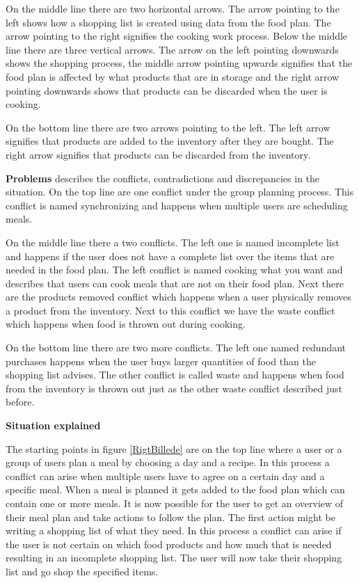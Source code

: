 On the middle line there are two horizontal arrows. The arrow pointing to the left shows how a shopping list is created using data from the food plan. The arrow pointing to the right signifies the cooking work process. Below the middle line there are three vertical arrows. The arrow on the left pointing downwards shows the shopping process, the middle arrow pointing upwards signifies that the food plan is affected by what products that are in storage and the right arrow pointing downwards shows that products can be discarded when the user is cooking. 

On the bottom line there are two arrows pointing to the left. The left arrow signifies that products are added to the inventory after they are bought. The right arrow signifies that products can be discarded from the inventory.            

\textbf{Problems} describes the conflicts, contradictions and discrepancies in the situation. On the top line are one conflict under the group planning process. This conflict is named synchronizing and happens when multiple users are scheduling meals. 

On the middle line there a two conflicts. The left one is named incomplete list and happens if the user does not have a complete list over the items that are needed in the food plan. The left conflict is named cooking what you want and describes that users can cook meals that are not on their food plan. Next there are the products removed conflict which happens when a user physically removes a product from the inventory. Next to this conflict we have the waste conflict which happens when food is thrown out during cooking.  

On the bottom line there are two more conflicts. The left one named redundant purchases happens when the user buys larger quantities of food than the shopping list advises. The other conflict is called waste and happens when food from the inventory is thrown out just as the other waste conflict described just before.           

\textbf{Situation explained}

The starting points in figure \ref{RigtBillede} are on the top line where a user or a group of users plan a meal by choosing a day and a recipe. In this process a conflict can arise when multiple users have to agree on a certain day and a specific meal. When a meal is planned it gets added to the food plan which can contain one or more meals. It is now possible for the user to get an overview of their meal plan and take actions to follow the plan. The first action might be writing a shopping list of what they need. In this process a conflict can arise if the user is not certain on which food products and how much that is needed resulting in an incomplete shopping list. The user will now take their shopping list and go shop the specified items. 

